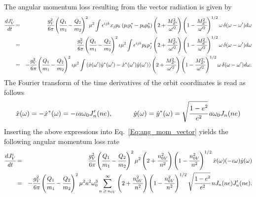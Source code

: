 \documentclass[aps,prd]{revtex4-2}
\begin{document}
The angular momentum loss resulting from the vector radiation is given by 
\begin{eqnarray}\label{Eq:ang_mom_vector}
    \cfrac{dJ_{V}^{i}}{dt} &=& \cfrac{g_{V}^2}{6\pi}\left(\cfrac{Q_{1}}{m_{1}} - \cfrac{Q_{2}}{m_{2}}\right)^{2} \mu^{2} \int \epsilon^{ijk} x_{j} p_{k} \left(p_{l} p_{l}^{*} - p_{0} p_{0}^{*}\right) \left(2+\cfrac{M_{Z^{\prime}}^2}{\omega^{\prime 2}}\right)\left(1-\cfrac{M_{Z^{\prime}}^2}{\omega^{\prime 2}}\right)^{1/2} \omega\,\delta(\omega -\omega^{\prime}) d\omega\nonumber \\
    &=& \cfrac{g_{V}^2}{6\pi}\left(\cfrac{Q_{1}}{m_{1}} - \cfrac{Q_{2}}{m_{2}}\right)^2\iota\mu^2 \int \epsilon^{ijk} p_{k} p_{j}^{*} \left(2+\cfrac{M_{Z^{\prime}}^2}{\omega^{\prime 2}}\right) \left(1-\cfrac{M_{Z^{\prime}}^2}{\omega^{\prime 2}}\right)^{1/2} \omega\,\delta(\omega -\omega^{\prime}) d\omega\nonumber \\
    &=& -\cfrac{g_{V}^2}{6\pi}\left(\cfrac{Q_{1}}{m_{1}} - \cfrac{Q_{2}}{m_{2}}\right)^2\iota\mu^{2} \int \left(\dot{x}(\omega^{\prime}) \dot{y}^{*}(\omega^{\prime}) - \dot{x}^{*}(\omega^{\prime}) \dot{y}(\omega^{\prime}) \right)\left(2+\cfrac{M_{Z^{\prime}}^2}{\omega^{\prime 2}}\right)\left(1-\cfrac{M_{Z^{\prime}}^2}{\omega^{\prime 2}}\right)^{1/2} \omega\,\delta(\omega -\omega^{\prime}) d\omega.
\end{eqnarray}
The Fourier transform of the time derivatives of the orbit coordinates is read as follows
\begin{eqnarray}
    \dot{x}(\omega) = - \dot{x}^{*}(\omega) = -\iota a\omega_{0} J_{n}^{\prime}(ne), \qquad\quad \dot{y}(\omega) = \dot{y}^{*}(\omega) = \sqrt{\cfrac{1-e^2}{e^2}}\,a\omega_{0} J_{n}(ne)
\end{eqnarray}
Inserting the above expressions into Eq.~\eqref{Eq:ang_mom_vector} yields the following angular momentum loss rate
\begin{eqnarray} \label{dJV}
    \cfrac{dJ^{i}_{V}}{dt} &=& \cfrac{g_{V}^2}{6\pi}\left(\cfrac{Q_{1}}{m_{1}} - \cfrac{Q_{2}}{m_{2}}\right)^2 \mu^{2} \left(2+\cfrac{n_{0V}^2}{n^2}\right) \left(1-\cfrac{n_{0V}^2}{n^2}\right)^{1/2} \dot{x}(\omega) (-\iota \omega) \dot{y}(\omega) \nonumber \\
    &=& -\cfrac{g_{V}^2}{6\pi}\left(\cfrac{Q_{1}}{m_{1}} - \cfrac{Q_{2}}{m_{2}}\right)^{2} \mu^{2} a^{2} \omega_{0}^{3} \sum_{n\,\geq\,n_{0V}}^{\infty} \left(2+\cfrac{n_{0V}^2}{n^2}\right)\left(1-\cfrac{n_{0V}^2}{n^2}\right)^{1/2}\sqrt{\cfrac{1-e^2}{e^2}}\,n J_{n}(ne) J_{n}^{\prime}(ne).
\end{eqnarray}
\end{document}
